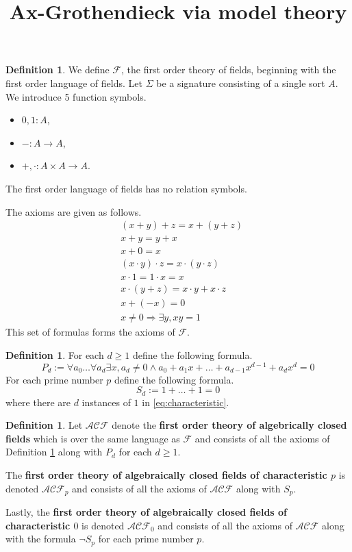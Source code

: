 \documentclass[12pt]{article}
\title{Ax-Grothendieck via model theory}
\theoremstyle{plain}
\theoremstyle{definition}
\newtheorem{defn}[thm]{Definition} %
\newcommand{\call}[1]{\mathcal{#1}}
\newcommand{\lto}{\longrightarrow}
\begin{document}
	\maketitle
	
	\begin{defn}\label{def:FoT_fields}
		We define $\call{F}$, the first order theory of fields, beginning with the first order language of fields. Let $\Sigma$ be a signature consisting of a single sort $A$. We introduce 5 function symbols.
		\begin{itemize}
			\item $0,1: A$,
			\item $-: A \lto A$,
			\item $+, \cdot: A \times A \lto A$.
			\end{itemize}
		The first order language of fields has no relation symbols.
		
		The axioms are given as follows.
		\begin{align}
			&(x + y) + z = x + (y + z)\\
			&x + y = y + x\\
			&x + 0 = x\\
			&(x\cdot y)\cdot z = x \cdot (y \cdot z)\\
			&x \cdot 1 = 1 \cdot x = x\\
			&x\cdot (y + z) = x\cdot y + x \cdot z\\
			&x + (-x) = 0\\
			&x\neq 0 \Rightarrow \exists y, xy = 1
			\end{align}
		This set of formulas forms the axioms of $\call{F}$.
		\end{defn}
	
	\begin{defn}
		For each $d \geq 1$ define the following formula.
		\begin{equation}
			P_d := \forall a_0 \ldots \forall a_d \exists x, a_d \neq 0 \wedge a_0 + a_1 x + \ldots + a_{d-1}x^{d-1} + a_dx^d = 0
			\end{equation}
		For each prime number $p$ define the following formula.
		\begin{equation}\label{eq:characteristic}
			S_d := 1 + \ldots + 1 = 0
			\end{equation}
		where there are $d$ instances of $1$ in \eqref{eq:characteristic}.
		\end{defn}
	
	\begin{defn}
		Let $\call{ACF}$ denote the \textbf{first order theory of algebrically closed fields} which is over the same language as $\call{F}$ and consists of all the axioms of Definition \ref{def:FoT_fields} along with $P_d$ for each $d \geq 1$.
		
		The \textbf{first order theory of algebraically closed fields of characteristic $p$} is denoted $\call{ACF}_p$ and consists of all the axioms of $\call{ACF}$ along with $S_p$.
		
		Lastly, the \textbf{first order theory of algebraically closed fields of characteristic $0$} is denoted $\call{ACF}_0$ and consists of all the axioms of $\call{ACF}$ along with the formula $\neg S_p$ for each prime number $p$.
		\end{defn}
	
\end{document}
